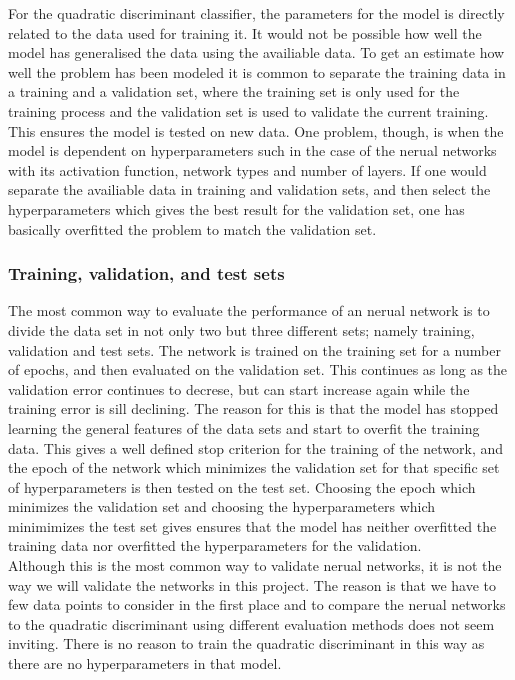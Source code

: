 For the quadratic discriminant classifier, the parameters for the model is directly related to the data used for training it. It would not be possible how well the model has generalised the data using the availiable data. To get an estimate how well the problem has been modeled it is common to separate the training data in a training and a validation set, where the training set is only used for the training process and the validation set is used to validate the current training. This ensures the model is tested on new data. One problem, though, is when the model is dependent on hyperparameters such in the case of the nerual networks with its activation function, network types and number of layers. If one would separate the availiable data in training and validation sets, and then select the hyperparameters which gives the best result for the validation set, one has basically overfitted the problem to match the validation set.

\subsubsection{Training, validation, and test sets}

The most common way to evaluate the performance of an nerual network is to divide the data set in not only two but three different sets; namely training, validation and test sets. The network is trained on the training set for a number of epochs, and then evaluated on the validation set. This continues as long as the validation error continues to decrese, but can start increase again while the training error is sill declining. The reason for this is that the model has stopped learning the general features of the data sets and start to overfit the training data. This gives a well defined stop criterion for the training of the network, and the epoch of the network which minimizes the validation set for that specific set of hyperparameters is then tested on the test set. Choosing the epoch which minimizes the validation set and choosing the hyperparameters which minimimizes the test set gives ensures that the model has neither overfitted the training data nor overfitted the hyperparameters for the validation.\\

Although this is the most common way to validate nerual networks, it is not the way we will validate the networks in this project. The reason is that we have to few data points to consider in the first place and to compare the nerual networks to the quadratic discriminant using different evaluation methods does not seem inviting. There is no reason to train the quadratic discriminant in this way as there are no hyperparameters in that model.

